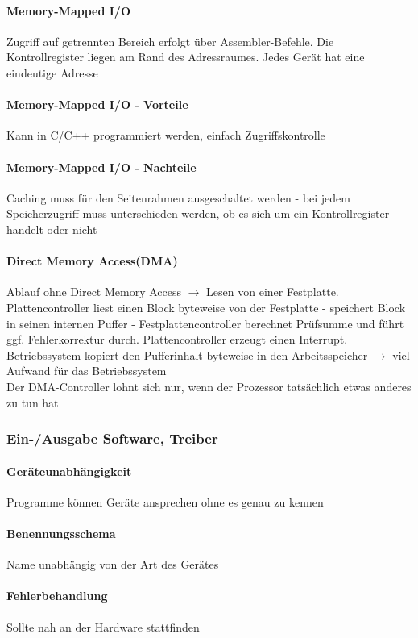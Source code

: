 \documentclass[11pt,a4paper,landscape]{article}
\begin{document}
\begin{multicols*}{3}
	\paragraph{Memory-Mapped I/O} Zugriff auf getrennten Bereich erfolgt über Assembler-Befehle. Die Kontrollregister liegen am Rand des Adressraumes. Jedes Gerät hat eine eindeutige Adresse
	\paragraph{Memory-Mapped I/O - Vorteile} Kann in C/C++ programmiert werden, einfach Zugriffskontrolle
	\paragraph{Memory-Mapped I/O - Nachteile} Caching muss für den Seitenrahmen ausgeschaltet werden - bei jedem Speicherzugriff muss unterschieden werden, ob es sich um ein Kontrollregister handelt oder nicht
	\paragraph{Direct Memory Access(DMA)} Ablauf ohne Direct Memory Access $\rightarrow$ Lesen von einer Festplatte. Plattencontroller liest einen Block byteweise von der Festplatte - speichert Block in seinen internen Puffer - Festplattencontroller berechnet Prüfsumme und führt ggf. Fehlerkorrektur durch. Plattencontroller erzeugt einen Interrupt. Betriebssystem kopiert den Pufferinhalt byteweise in den Arbeitsspeicher $\rightarrow$ viel Aufwand für das Betriebssystem\\
	Der DMA-Controller lohnt sich nur, wenn der Prozessor tatsächlich etwas anderes zu tun hat
	\subsubsection{Ein-/Ausgabe Software, Treiber}
	\paragraph{Geräteunabhängigkeit} Programme können Geräte ansprechen ohne es genau zu kennen
	\paragraph{Benennungsschema} Name unabhängig von der Art des Gerätes
	\paragraph{Fehlerbehandlung} Sollte nah an der Hardware stattfinden

\end{multicols*}
\end{document}
